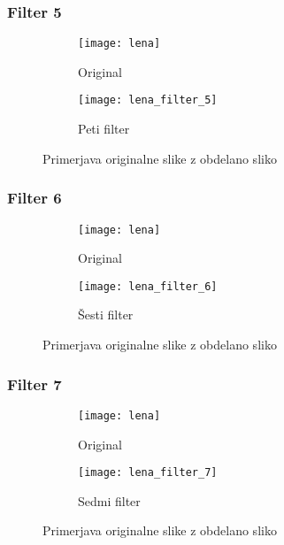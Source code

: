 \subsubsection*{Filter 5}
\begin{figure}[h]
    \centering
    \begin{subfigure}[b]{0.4\textwidth}
        \texttt{[image: lena]}
        \caption{Original}
    \end{subfigure}
    \begin{subfigure}[b]{0.4\textwidth}
        \texttt{[image: lena\_filter\_5]}
        \caption{Peti filter}
    \end{subfigure}
    \caption{Primerjava originalne slike z obdelano sliko}
    \label{fig:lena_filter_5}
\end{figure}


\subsubsection*{Filter 6}
\begin{figure}[h]
    \centering
    \begin{subfigure}[b]{0.4\textwidth}
        \texttt{[image: lena]}
        \caption{Original}
    \end{subfigure}
    \begin{subfigure}[b]{0.4\textwidth}
        \texttt{[image: lena\_filter\_6]}
        \caption{Šesti filter}
    \end{subfigure}
    \caption{Primerjava originalne slike z obdelano sliko}
    \label{fig:lena_filter_6}
\end{figure}


\subsubsection*{Filter 7}
\begin{figure}[h]
    \centering
    \begin{subfigure}[b]{0.4\textwidth}
        \texttt{[image: lena]}
        \caption{Original}
    \end{subfigure}
    \begin{subfigure}[b]{0.4\textwidth}
        \texttt{[image: lena\_filter\_7]}
        \caption{Sedmi filter}
    \end{subfigure}
    \caption{Primerjava originalne slike z obdelano sliko}
    \label{fig:lena_filter_7}
\end{figure}


